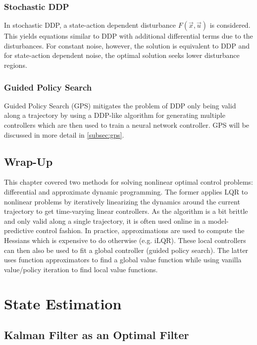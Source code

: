 		\subsection{Stochastic DDP}
			In stochastic DDP, a state-action dependent disturbance \( F(\vec{x}, \vec{u}) \) is considered. This yields equations similar to DDP with additional differential terms due to the disturbances. For constant noise, however, the solution is equivalent to DDP and for state-action dependent noise, the optimal solution seeks lower disturbance regions.

		\subsection{Guided Policy Search}
			Guided Policy Search (GPS) mitigates the problem of DDP only being valid along a trajectory by using a DDP-like algorithm for generating multiple controllers which are then used to train a neural network controller. GPS will be discussed in more detail in \autoref{subsec:gps}.

	\section{Wrap-Up}
		This chapter covered two methods for solving nonlinear optimal control problems: differential and approximate dynamic programming. The former applies LQR to nonlinear problems by iteratively linearizing the dynamics around the current trajectory to get time-varying linear controllers. As the algorithm is a bit brittle and only valid along a single trajectory, it is often used online in a model-predictive control fashion. In practice, approximations are used to compute the Hessians which is expensive to do otherwise (e.g. iLQR). These local controllers can then also be used to fit a global controller (guided policy search). The latter uses function approximators to find a global value function while using vanilla value/policy iteration to find local value functions.

\chapter{State Estimation} %
	\label{c:stateEstimation}


	\section{Kalman Filter as an Optimal Filter} %

